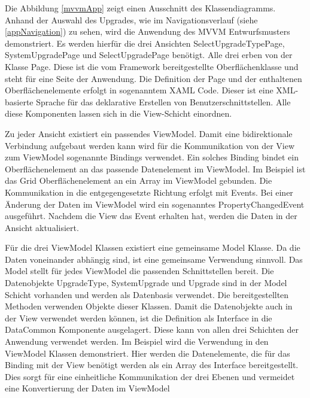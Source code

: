 Die Abbildung \ref{mvvmApp} zeigt einen Ausschnitt des Klassendiagramms. Anhand der Auswahl des Upgrades, wie im Navigationsverlauf (siehe \ref{appNavigation}) zu sehen, wird die Anwendung des MVVM Entwurfsmusters demonstriert. Es werden hierfür die drei Ansichten SelectUpgradeTypePage, SystemUpgradePage und SelectUpgradePage benötigt. Alle drei erben von der Klasse Page. Diese ist die vom Framework bereitgestellte Oberflächenklasse und steht für eine Seite der Anwendung. Die Definition der Page und der enthaltenen Oberflächenelemente erfolgt in sogenanntem XAML Code. Dieser ist eine XML-basierte Sprache für das deklarative Erstellen von Benutzerschnittstellen. Alle diese Komponenten lassen sich in die View-Schicht einordnen. \par 

Zu jeder Ansicht existiert ein passendes ViewModel. Damit eine bidirektionale Verbindung aufgebaut werden kann wird für die Kommunikation von der View zum ViewModel sogenannte Bindings verwendet. Ein solches Binding bindet ein Oberflächenelement an das passende Datenelement im ViewModel. Im Beispiel ist das Grid Oberflächenelement an ein Array im ViewModel gebunden. Die Kommunikation in die entgegengesetzte Richtung erfolgt mit Events. Bei einer Änderung der Daten im ViewModel wird ein sogenanntes PropertyChangedEvent ausgeführt. Nachdem die View das Event erhalten hat, werden die Daten in der Ansicht aktualisiert. \par

Für die drei ViewModel Klassen existiert eine gemeinsame Model Klasse. Da die Daten voneinander abhängig sind, ist eine gemeinsame Verwendung sinnvoll. Das Model stellt für jedes ViewModel die passenden Schnittstellen bereit. Die Datenobjekte UpgradeType, SystemUpgrade und Upgrade sind in der Model Schicht vorhanden und werden als Datenbasis verwendet. Die bereitgestellten Methoden verwenden Objekte dieser Klassen. Damit die Datenobjekte auch in der View verwendet werden können, ist die Definition als Interface in die DataCommon Komponente ausgelagert. Diese kann von allen drei Schichten der Anwendung verwendet werden. Im Beispiel wird die Verwendung in den ViewModel Klassen demonstriert. Hier werden die Datenelemente, die für das Binding mit der View benötigt werden als ein Array des Interface bereitgestellt. Dies sorgt für eine einheitliche Kommunikation der drei Ebenen und vermeidet eine Konvertierung der Daten im ViewModel


